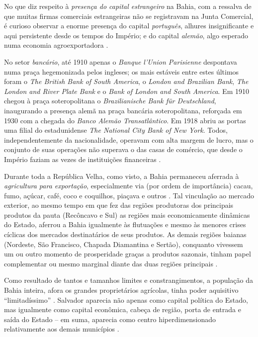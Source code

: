 No que diz respeito à \textit{presença do capital estrangeiro} na Bahia, com a ressalva de que muitas firmas comerciais estrangeiras não se registravam na Junta Comercial, é curioso observar a enorme presença do capital \textit{português}, alhures insignificante e aqui persistente desde os tempos do Império; e do capital \textit{alemão}, algo esperado numa economia agroexportadora \cite[p.~69-70]{CPE1980}. 

No setor \textit{bancário}, até 1910 apenas o \textit{Banque l'Union Parisienne} despontava numa praça hegemonizada pelos ingleses; os mais estáveis entre estes últimos foram o \textit{The British Bank of South America}, o \textit{London and Brazilian Bank}, \textit{The London and River Plate Bank} e o \textit{Bank of London and South America}. Em 1910 chegou à praça soteropolitana o \textit{Brazilianische Bank für Deutschland}, inaugurando a presença alemã na praça bancária soteropolitana, reforçada em 1930 com a chegada do \textit{Banco Alemão Transatlântico}. Em 1918 abriu as portas uma filial do estadunidense \textit{The National City Bank of New York}. Todos, independentemente da nacionalidade, operavam com alta margem de lucro, mas o conjunto de suas operações não superava o das casas de comércio, que desde o Império faziam as vezes de instituições financeiras \cite[p.~55]{CPE1980}.

Durante toda a República Velha, como visto, a Bahia permaneceu aferrada à \textit{agricultura para exportação}, especialmente via (por ordem de importância) cacau, fumo, açúcar, café, coco e coquilhos, piaçava e outros \cite[p.~77;110]{CPE1980}. Tal vinculação ao mercado exterior, ao mesmo tempo em que fez das regiões produtoras dos principais produtos da pauta (Recôncavo e Sul) as regiões mais economicamente dinâmicas do Estado, aferrou a Bahia igualmente às flutuações e mesmo às menores crises cíclicas dos mercados destinatários de seus produtos. As demais regiões baianas (Nordeste, São Francisco, Chapada Diamantina e Sertão), conquanto vivessem um ou outro momento de prosperidade graças a produtos sazonais, tinham papel complementar ou mesmo marginal diante das duas regiões principais \cite[p.~77]{CPE1980}.

Como resultado de tantos e tamanhos limites e constrangimentos, a população da Bahia inteira, afora os grandes proprietários agrícolas, tinha poder aquisitivo ``limitadíssimo'' \cite[p.~189]{azevedolins_bancoba_1969}. Salvador aparecia não apenas como capital política do Estado, mas igualmente como capital econômica, cabeça de região, porta de entrada e saída do Estado -- em suma, aparecia como centro hiperdimensionado relativamente aos demais municípios \cite[p.~63]{CPE1980}.

